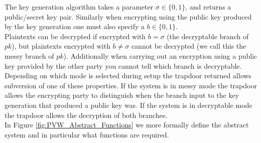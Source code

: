 \documentclass[ %
                    author={Nicholas Tutte},
                supervisor={Prof. Nigel Smart},
                    degree={MEng},
                     title={Secure Two Party Computation},
                  subtitle={A practical comparison of recent protocols},
                      type={Research - GG1K},
                      year={2015} ]{dissertation}
\begin{document}
					The key generation algorithm takes a parameter $\sigma \in \{0, 1\}$, and returns a public/secret key pair. Similarly when encrypting using the public key produced by the key generation one must also specify a $b \in \{0, 1\}$.\\

					Plaintexts can be decrypted if encrypted with $b = \sigma$ (the decryptable branch of $pk$), but plaintexts encrypted with $b \neq \sigma$ cannot be decrypted (we call this the messy branch of $pk$). Additionally when carrying out an encryption using a public key provided by the other party you cannot tell which branch is decryptable.\\

					Depending on which mode is selected during setup the trapdoor returned allows subversion of one of these properties. If the system is in messy mode the trapdoor allows the encrypting party to distinguish when the branch input to the key generation that produced a public key was. If the system is in decryptable mode the trapdoor allows the decryption of both branches.\\

					In Figure \ref{fig:PVW_Abstract_Functions} we more formally define the abstract system and in particular what functions are required.\\
\end{document}
